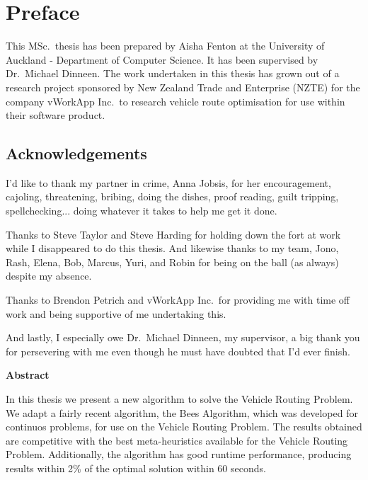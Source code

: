 
\chapter*{Preface}

This MSc.\ thesis has been prepared by Aisha Fenton at the University of Auckland - Department of Computer Science. It has been supervised by Dr.\ Michael Dinneen. The work undertaken in this thesis has grown out of a research project sponsored by New Zealand Trade and Enterprise (NZTE) for the company vWorkApp Inc.\ to research vehicle route optimisation for use within their software product.

\section*{Acknowledgements}

I'd like to thank my partner in crime, Anna Jobsis, for her encouragement, cajoling, threatening, bribing, doing the dishes, proof reading, guilt tripping, spellchecking... doing whatever it takes to help me get it done.

Thanks to Steve Taylor and Steve Harding for holding down the fort at work while I disappeared to do this thesis. And likewise thanks to my team, Jono, Rash, Elena, Bob, Marcus, Yuri, and Robin for being on the ball (as always) despite my absence.

Thanks to Brendon Petrich and vWorkApp Inc.\ for providing me with time off work and being supportive of me undertaking this. 

And lastly, I especially owe Dr.\ Michael Dinneen, my supervisor, a big thank you for persevering with me even though he must have doubted that I'd ever finish.

\cleardoublepage

\begin{center}
   \begin{minipage}{300pt}
   \begin{center}
      \textbf{Abstract}
   \end{center}
   In this thesis we present a new algorithm to solve the Vehicle Routing Problem. We adapt a fairly recent algorithm, the Bees Algorithm, which was developed for continuos problems, for use on the Vehicle Routing Problem. The results obtained are competitive with the best meta-heuristics available for the Vehicle Routing Problem. Additionally, the algorithm has good runtime performance, producing results within 2\% of the optimal solution within 60 seconds.
   \end{minipage}
\end{center}

\cleardoublepage
